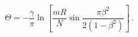 \begin{equation}
\Theta = -\frac {\gamma}{\pi} \ln \left [ \frac {mR}{N} \sin \frac {\pi \beta ^2}{2(1-\beta ^2)} \right ] \, . \label {theta}
\end{equation}

